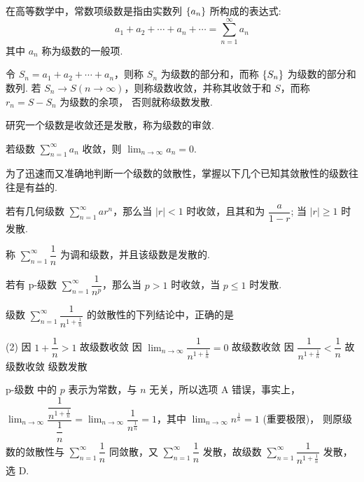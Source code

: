 在高等数学中，常数项级数是指由实数列 $\qty{a_n}$ 所构成的表达式:
$$a_1+a_2+\cdots+a_n+\cdots=\sum_{n=1}^{\infty}a_n$$
其中 $a_n$ 称为级数的一般项.

令 $S_n=a_1+a_2+\cdots+a_n$，则称 $S_n$ 为级数的部分和，而称 $\qty{S_n}$ 为级数的部分和数列.
若 $S_n\to S(n\to\infty)$，则称级数收敛，并称其收敛于和 $S$，而称 $r_n=S-S_n$ 为级数的余项，
否则就称级数发散.

研究一个级数是收敛还是发散，称为级数的审敛.
\begin{theorem}[级数收敛的必要条件]
    若级数 $\displaystyle\sum_{n=1}^{\infty}a_n$ 收敛，则 $\displaystyle\lim_{n\to\infty}a_n=0$.
\end{theorem}

为了迅速而又准确地判断一个级数的敛散性，掌握以下几个已知其敛散性的级数往往是有益的.

\begin{theorem}[几何级数]
    若有几何级数 $\displaystyle\sum_{n=1}^{\infty}ar^n$，那么当 $|r|<1$ 时收敛，且其和为 $\dfrac{a}{1-r}$; 当 $|r|\geqslant 1$ 时发散.
\end{theorem}

\begin{theorem}[调和级数]
    称 $\displaystyle\sum_{n=1}^{\infty}\dfrac{1}{n}$ 为调和级数，并且该级数是发散的.
\end{theorem}

\begin{theorem}[p-级数]
    若有 p-级数 $\displaystyle\sum_{n=1}^{\infty}\dfrac{1}{n^p}$，那么当 $p>1$ 时收敛，当 $p\leqslant 1$ 时发散.
\end{theorem}

\begin{example}
    级数 $\displaystyle\sum_{n=1}^{\infty}\dfrac{1}{n^{1+\frac{1}{n}}}$ 的敛散性的下列结论中，正确的是 
    \begin{tasks}(2)
        \task 因 $1+\dfrac{1}{n}>1$ 故级数收敛
        \task 因 $\displaystyle\lim_{n\to\infty}\dfrac{1}{n^{1+\frac{1}{n}}}=0$ 故级数收敛
        \task 因 $\dfrac{1}{n^{1+\frac{1}{n}}}<\dfrac{1}{n}$ 故级数收敛
        \task 级数发散
        \end{tasks}
\end{example}
\begin{solution}
    p-级数 中的 $p$ 表示为常数，与 $n$ 无关，所以选项 A 错误，事实上，$\displaystyle \lim_{n\to\infty}\dfrac{\dfrac{1}{n^{1+\frac{1}{n}}}}{\dfrac{1}{n}}=\lim_{n\to\infty}\dfrac{1}{n^{\frac{1}{n}}}=1$，其中 $\displaystyle\lim_{n\to\infty}n^{\frac{1}{n}}=1$ (重要极限)，
    则原级数的敛散性与 $\displaystyle\sum_{n=1}^{\infty}\dfrac{1}{n}$ 同敛散，又 $\displaystyle\sum_{n=1}^{\infty}\dfrac{1}{n}$ 发散，故级数 $\displaystyle\sum_{n=1}^{\infty}\dfrac{1}{n^{1+\frac{1}{n}}}$ 发散，选 D.
\end{solution}

